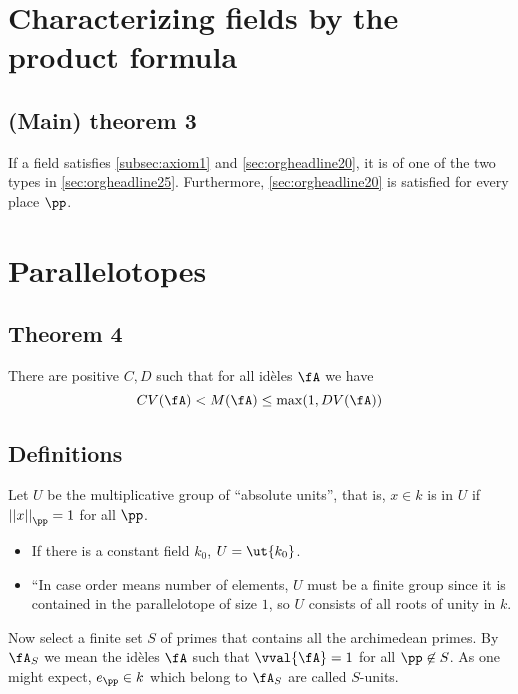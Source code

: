 \section{Characterizing fields by the product formula}
\label{sec:orgheadline28}

\subsection{(Main) theorem 3}
\label{sec:orgheadline27}
If a field satisfies \ref{subsec:axiom1} and \ref{sec:orgheadline20}, it is of one of the two types in \ref{sec:orgheadline25}. Furthermore, \ref{sec:orgheadline20} is satisfied for every place \(\pp\).

\section{Parallelotopes}
\label{sec:orgheadline31}

\subsection{Theorem 4}
\label{sec:orgheadline29}
There are positive \(C, D\) such that for all id\`eles \(\fA\) we have
\[ CV(\fA) < M(\fA) \leq \max(1, DV(\fA)) \]


\subsection{Definitions}
\label{sec:orgheadline30}
Let \(U\) be the multiplicative group of ``absolute units'', that is, \(x\in k\) is in \(U\) if \({||x||}_\pp = 1\) for all \(\pp\).
\begin{itemize}
\item If there is a constant field \(k_0\), \(U=\ut {k_0}\).
\item ``In case order means number of elements, \(U\) must be a finite group since it is contained in the parallelotope of size \(1\), so \(U\) consists of all roots of unity in \(k\).
\end{itemize}
Now select a finite set \(S\) of primes that contains all the archimedean primes. By \(\fA_S\) we mean the id\`eles \(\fA\) such that \(\vval{ \fA } = 1\) for all \(\pp\not\in S\). As one might expect, \(e_\pp\in k\) which belong to \(\fA_S\) are called \(S\)-units.

